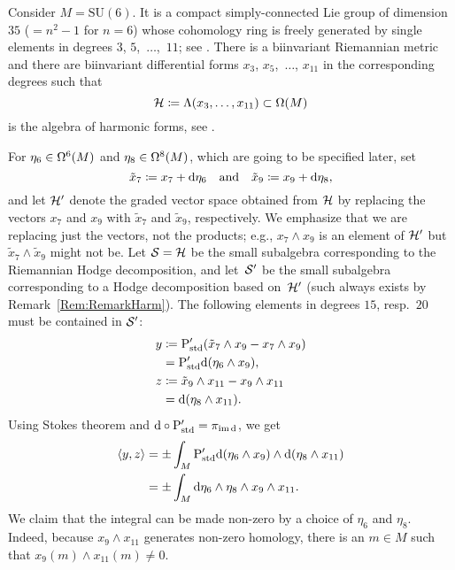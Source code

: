 \documentclass[\MainFolder/Text.tex]{subfiles}
\begin{document}
\begin{Example}\label{Ex:SUsix}
Consider $M=\mathrm{SU}(6)$.
It is a compact simply-connected Lie group of dimension~$35$ ($=n^2 - 1$ for $n=6$) whose cohomology ring is freely generated by single elements in degrees  $3$, $5$,~$\dotsc$,~$11$; see \cite[Corollary~3.11]{Mimura1991}.
There is a biinvariant Riemannian metric and there are biinvariant differential forms $x_3$, $x_5$,~$\dotsc$, $x_{11}$ in the corresponding degrees such that 
\[
\mathcal{H} \coloneqq \Lambda(x_3, \dotsc, x_{11})\subset \Omega(M)
\]
is the algebra of harmonic forms, see \cite[Chapter~1]{Felix2008}.

For $\eta_6\in \Omega^6(M)$ and $\eta_8\in\Omega^8(M)$, which are going to be specified later, set
\[
\tilde{x}_7 \coloneqq x_7 + \mathrm{d} \eta_6\quad\text{and}\quad\tilde{x}_9 \coloneqq x_9 + \mathrm{d} \eta_8,
\]
and let $\mathcal{H}'$ denote the graded vector space obtained from $\mathcal{H}$ by replacing the vectors $x_{7}$ and $x_{9}$ with $\tilde{x}_7$ and $\tilde{x}_9$, respectively.
We emphasize that we are replacing just the vectors, not the products; e.g., $x_7\wedge x_9$ is an element of $\mathcal{H}'$ but $\tilde{x}_7\wedge \tilde{x}_9$ might not be.
Let $\mathcal{S} = \mathcal{H}$ be the small subalgebra corresponding to the Riemannian Hodge decomposition, and let~$\mathcal{S}'$ be the small subalgebra corresponding to a Hodge decomposition based on~$\mathcal{H}'$ (such always exists by Remark~\ref{Rem:RemarkHarm}).
The following elements in degrees $15$, resp.~$20$ must be contained in $\mathcal{S}'$:
\begin{align*}
y&\coloneqq\mathrm{P}_{\mathrm{std}}'(\tilde{x}_7 \wedge x_9 -x_7 \wedge x_9)\\
 &=\mathrm{P}_{\mathrm{std}}'\mathrm{d}(\eta_6 \wedge x_9),\\
z&\coloneqq\tilde{x}_9 \wedge x_{11} - x_9 \wedge x_{11}\\
 &=\mathrm{d}(\eta_8 \wedge x_{11}).
\end{align*}
Using Stokes theorem and $\mathrm{d}\circ\mathrm{P}_{\mathrm{std}}' = \pi_{\operatorname{im} \mathrm{d}}$, we get
\begin{align*}
\langle y,z\rangle & = \pm \int_{M} \mathrm{P}_{\mathrm{std}}'\mathrm{d}(\eta_6 \wedge x_9) \wedge\mathrm{d}(\eta_8 \wedge x_{11})\\
&= \pm \int_{M} \mathrm{d}\eta_6\wedge \eta_8 \wedge x_9 \wedge x_{11}.
\end{align*}
We claim that the integral can be made non-zero by a choice of $\eta_6$ and $\eta_8$.
Indeed, because $x_9\wedge x_{11}$ generates non-zero homology, there is an $m\in M$ such that $x_9(m)\wedge x_{11}(m)\neq 0$.

\end{Example}
\end{document}
